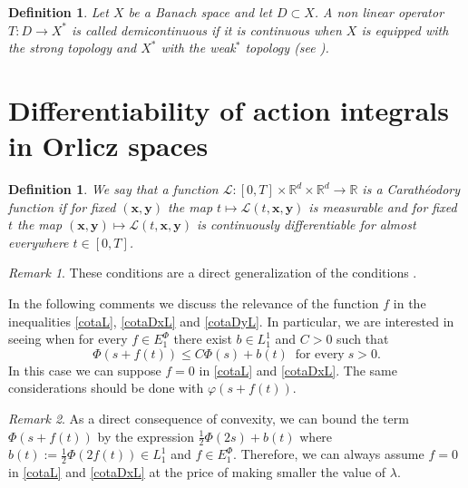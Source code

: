 \documentclass[twoside]{article}
\newtheorem{defi}[thm]{Definition}
\theoremstyle{remark}
\newtheorem{comentario}{Remark}
\newcommand{\ephi}{E^{\Phi}}
\renewcommand{\b}[1]{\boldsymbol{#1}}
\renewcommand{\leq}{\leqslant}
\begin{document}
\begin{defi} Let $X$ be a Banach space and let $D\subset X$. A non linear operator $T:D\to X^*$ is called \emph{demicontinuous} if it is continuous when $X$ is equipped with the strong topology and $X^*$ with the weak${}^*$ topology 
(see \cite{kato1964demicontinuity}).
\end{defi} 

\section{Differentiability of action integrals in Orlicz spaces}

\begin{defi} We say that a function $\mathcal{L}:[0,T]\times \mathbb{R}^d \times \mathbb{R}^d \rightarrow \mathbb{R}$ is a Carath\'eodory function if for fixed $(\b{x},\b{y})$
the map $t \mapsto \mathcal{L}(t, \b{x},\b{y})$ is measurable  and for fixed $t$ the map  $(\b{x},\b{y}) \mapsto \mathcal{L}(t, \b{x}, \b{y})$ is continuously differentiable for almost everywhere $t\in [0,T]$.

\end{defi}





\begin{comentario}These conditions are a direct  generalization of the conditions
\cite[Eq (a), p. 10]{mawhin2010critical}. 
\end{comentario}

In the following comments we discuss the relevance of the function $f$ in the inequalities \eqref{cotaL},  \eqref{cotaDxL} and \eqref{cotaDyL}. In particular, we are interested in seeing when for every  $f\in \ephi_1$ there exist
$b\in L^1_1$ and $C>0$ such that 
\begin{equation}\label{cotadb}
\Phi(s+f(t))\leq C\Phi(s)+b(t)\;\;\mbox{for every}\;s>0.
\end{equation} 
In this case we can suppose $f=0$ in \eqref{cotaL} and \eqref{cotaDxL}. The same considerations should be done with $\varphi\left(s+f(t)\right)$.

\begin{comentario}  As a direct consequence of convexity, we can  bound the term $\Phi(s+f(t))$ by the expression  $\frac12\Phi(2s)+b(t)$ where $b(t):=\tfrac12\Phi(2f(t))\in L^1_1$ and $f\in \ephi_1$. Therefore, we can always assume $f = 0$ in \eqref{cotaL} and \eqref{cotaDxL} at the price of making smaller the value of $\lambda$. 
\end{comentario}
\end{document}
